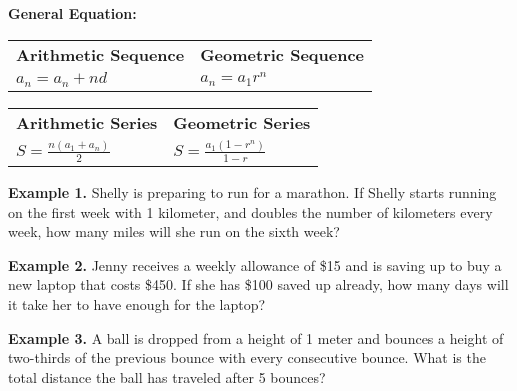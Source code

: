 \documentclass[12pt]{article}
\begin{document}
\bigskip
\textbf{General Equation:}

\bigskip
\begin{tabularx}{\textwidth}{*2{@{}>{\centering\arraybackslash}X}}
\textbf{Arithmetic Sequence} & \textbf{Geometric Sequence}\\
$a_n=a_n+nd$ & $a_n=a_1r^n$
\end{tabularx}

\vfill
\begin{tabularx}{\textwidth}{*2{@{}>{\centering\arraybackslash}X}}
\textbf{Arithmetic Series} & \textbf{Geometric Series}\\
$S=\frac{n(a_1+a_n)}{2}$ & $S=\frac{a_1(1-r^n)}{1-r}$
\end{tabularx}

\vfill
\textbf{Example 1.} Shelly is preparing to run for a marathon. If Shelly starts running on the first week with 1 kilometer, and doubles the number of kilometers every week, how many miles will she run on the sixth week?

\vfill
\textbf{Example 2.} Jenny receives a weekly allowance of \$15 and is saving up to buy a new laptop that costs \$450. If she has \$100 saved up already, how many days will it take her to have enough for the laptop?

\vfill
\textbf{Example 3.} A ball is dropped from a height of 1 meter and bounces a height of two-thirds of the previous bounce with every consecutive bounce. What is the total distance the ball has traveled after 5 bounces?
\end{document}
